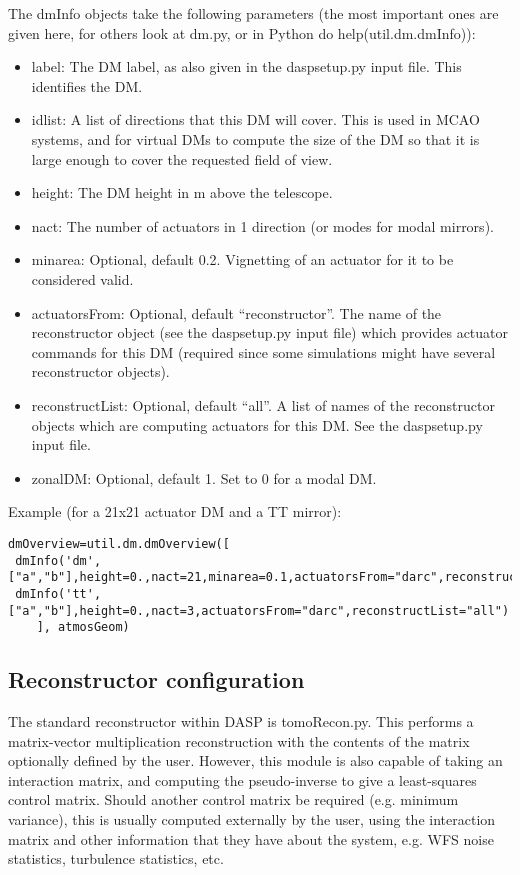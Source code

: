 \documentclass{article}
\begin{document}
The dmInfo objects take the following parameters (the most important
ones are given here, for others look at dm.py, or in Python do
help(util.dm.dmInfo)):
\begin{itemize}
\item label: The DM label, as also given in the daspsetup.py input
  file.  This identifies the DM.
\item idlist: A list of directions that this DM will cover.  This is
  used in MCAO systems, and for virtual DMs to compute the size of the
  DM so that it is large enough to cover the requested field of view.
\item height: The DM height in m above the telescope.
\item nact: The number of actuators in 1 direction (or modes for modal
  mirrors).
\item minarea: Optional, default 0.2.  Vignetting of an actuator for it to be considered
  valid.
\item actuatorsFrom: Optional, default ``reconstructor''.  The name of
  the reconstructor object (see the daspsetup.py input file) which
  provides actuator commands for this DM (required since some
  simulations might have several reconstructor objects).
\item reconstructList: Optional, default ``all''.  A list of names of the reconstructor objects which are computing
actuators for this DM.  See the daspsetup.py input file.
\item zonalDM: Optional, default 1.  Set to 0 for a modal DM.
\end{itemize}

Example (for a 21x21 actuator DM and a TT mirror):
\begin{verbatim}
dmOverview=util.dm.dmOverview([
 dmInfo('dm',["a","b"],height=0.,nact=21,minarea=0.1,actuatorsFrom="darc",reconstructList="all")
 dmInfo('tt',["a","b"],height=0.,nact=3,actuatorsFrom="darc",reconstructList="all")
    ], atmosGeom)
\end{verbatim}

\subsection{Reconstructor configuration}
The standard reconstructor within DASP is tomoRecon.py.  This performs
a matrix-vector multiplication reconstruction with the contents of the
matrix optionally defined by the user.  However, this module is also
capable of taking an interaction matrix, and computing the
pseudo-inverse to give a least-squares control matrix.  Should another
control matrix be required (e.g.  minimum variance), this is usually
computed externally by the user, using the interaction matrix and
other information that they have about the system, e.g. WFS noise
statistics, turbulence statistics, etc.
\end{document}

